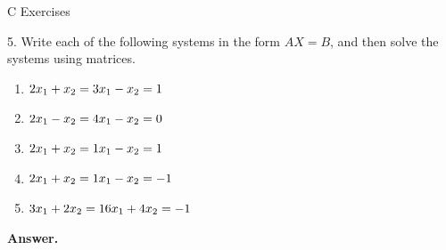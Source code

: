 \documentclass[10pt,]{book}
\theoremstyle{plain}
\theoremstyle{definition}
\theoremstyle{definition}
\theoremstyle{definition}
\theoremstyle{definition}
\begin{document}
\par\smallskip\noindent
\hypertarget{exercisegroup-9}{}\typeout{************************************************}
\typeout{************************************************}
C Exercises%
\begin{exercisegroup}
\item[5.]\hypertarget{exercise-26}{} Write each of the following systems in the form \(A X = B\), and then solve the systems using matrices.%
\par
\leavevmode%
\begin{multicols}{2}
\begin{enumerate}[label=\alph*]
\item\hypertarget{li-119}{} \(2x_1+x_2=3\\
x_1-x_2= 1\)%
\item\hypertarget{li-120}{} \(\text2x_1-x_2=4\\
x_1 -x_2= 0\)%
\item\hypertarget{li-121}{} \(2x_1+x_2=1\\
x_1 -x_2= 1\)%
\item\hypertarget{li-122}{} \(2x_1+x_2=1\\
x_1 -x_2= -1\)%
\item\hypertarget{li-123}{} \(3x_1+2x_2=1 \\
6 x_1 +4x_2= -1\) %
\end{enumerate}
\end{multicols}
%
\par\smallskip
\par\smallskip
\noindent\textbf{Answer.}\hypertarget{answer-14}{}\quad
\leavevmode%
\end{exercisegroup}
\end{document}
